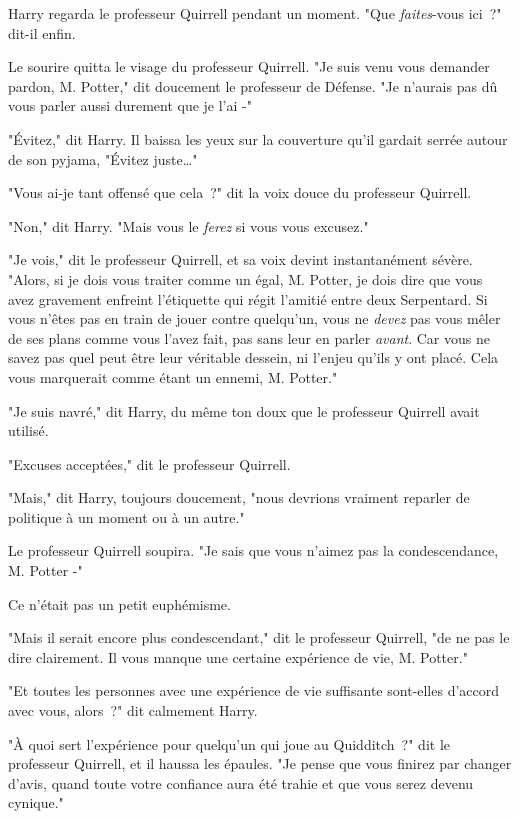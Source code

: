 Harry regarda le professeur Quirrell pendant un moment. "Que \emph{faites}-vous ici~?" dit-il enfin.

Le sourire quitta le visage du professeur Quirrell. "Je suis venu vous demander pardon, M. Potter," dit doucement le professeur de Défense. "Je n'aurais pas dû vous parler aussi durement que je l'ai -"

"Évitez," dit Harry. Il baissa les yeux sur la couverture qu'il gardait serrée autour de son pyjama, "Évitez juste…"

"Vous ai-je tant offensé que cela~?" dit la voix douce du professeur Quirrell.

"Non," dit Harry. "Mais vous le \emph{ferez} si vous vous excusez."

"Je vois," dit le professeur Quirrell, et sa voix devint instantanément sévère. "Alors, si je dois vous traiter comme un égal, M. Potter, je dois dire que vous avez gravement enfreint l'étiquette qui régit l'amitié entre deux Serpentard. Si vous n'êtes pas en train de jouer contre quelqu'un, vous ne \emph{devez} pas vous mêler de ses plans comme vous l'avez fait, pas sans leur en parler \emph{avant}. Car vous ne savez pas quel peut être leur véritable dessein, ni l'enjeu qu'ils y ont placé. Cela vous marquerait comme étant un ennemi, M. Potter."

"Je suis navré," dit Harry, du même ton doux que le professeur Quirrell avait utilisé.

"Excuses acceptées," dit le professeur Quirrell.

"Mais," dit Harry, toujours doucement, "nous devrions vraiment reparler de politique à un moment ou à un autre."

Le professeur Quirrell soupira. "Je sais que vous n'aimez pas la condescendance, M. Potter -"

Ce n'était pas un petit euphémisme.

"Mais il serait encore plus condescendant," dit le professeur Quirrell, "de ne pas le dire clairement. Il vous manque une certaine expérience de vie, M. Potter."

"Et toutes les personnes avec une expérience de vie suffisante sont-elles d'accord avec vous, alors~?" dit calmement Harry.

"À quoi sert l'expérience pour quelqu'un qui joue au Quidditch~?" dit le professeur Quirrell, et il haussa les épaules. "Je pense que vous finirez par changer d'avis, quand toute votre confiance aura été trahie et que vous serez devenu cynique."

